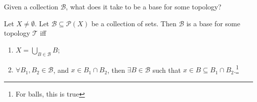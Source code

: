 \begin{goal}[question]
Given a collection $\mathcal{B}$, what does it take to be a base for some topology?
\end{goal}
\begin{prop}
    Let $X \neq \emptyset$. Let $\mathcal{B} \subseteq \mathcal{P}(X)$ be a collection of sets. Then 
    $\mathcal{B}$ is a base for some topology $\mathcal{T}$ iff 
    \begin{enumerate}
        \item $X = \bigcup_{B \in \mathcal{B}} B$;
        \item $\forall B_1, B_2 \in \mathcal{B}$, and $x \in B_1 \cap B_2$,
        then $\exists B \in \mathcal{B}$ such that $x \in B \subseteq B_1 \cap B_2$.\footnote{
            For balls, this is true}   
    \end{enumerate}    
\end{prop}

